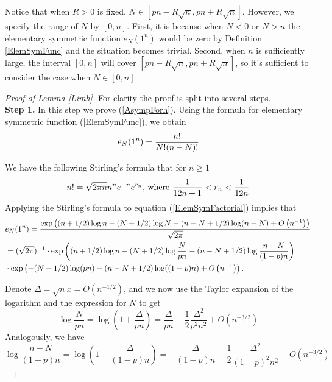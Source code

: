 \begin{remark}
	Notice that when $R>0$ is fixed, $N\in[pn-R\sqrt{n},pn+R\sqrt{n}]$. However, we specify the range of $N$ by $[0,n]$. First, it is because when $N<0$ or $N>n$ the elementary symmetric function $e_{N}(1^{n})$ would be zero by Definition \ref{ElemSymFunc} and the situation becomes trivial. Second, when $n$ is sufficiently large, the interval $[0,n]$ will cover $[pn-R\sqrt{n},pn+R\sqrt{n}]$, so it's sufficient to consider the case when $N\in[0,n]$.
\end{remark}
\begin{proof}[Proof of Lemma \ref{Limh}]
For clarity the proof is split into several steps.\\
\textbf{Step 1.} In this step we prove (\ref	{AsympForh}). Using the formula for elementary symmetric function (\ref{ElemSymFunc}), we obtain
\begin{align}{\label{ElemSymFactorial}}
	e_{N}(1^n)=\frac{n!}{N!(n-N)!}
\end{align}

We have the following Stirling's formula \cite{stirling} that for $n\geq 1$
\begin{equation}{\label{Stirling}}
	n!=\sqrt{2\pi n}n^ne^{-n}e^{r_{n}}\text{, where }\frac{1}{12n+1}<r_{n}<\frac{1}{12n}
\end{equation}
Applying the Stirling's formula to equation (\ref{ElemSymFactorial}) implies that
\begin{equation}{\label{hStirling}}
\begin{split}
	& e_{N}(1^n)=\frac{\exp\left( (n+1/2)\log n-(N+1/2)\log N-(n-N+1/2)\log(n-N)+O\left(n^{-1}\right) \right)}{\sqrt{2\pi}}\\
	& = (\sqrt{2\pi})^{-1}\cdot \exp\left((n+1/2)\log n -(N+1/2)\log \frac{N}{pn}-(n-N+1/2)\log \frac{n-N}{(1-p)n}\right)\\
	&\cdot \exp\left(-(N+1/2)\log(pn)-(n-N+1/2)\log((1-p)n)+O\left(n^{-1}\right)\right).
\end{split}
\end{equation}

Denote $\Delta=\sqrt{n}x=O\left(n^{-1/2}\right)$, and we now use the Taylor expansion of the logarithm and the expression for $N$ to get
\begin{equation*}
	\log \frac{N}{pn}=\log\left(1+\frac{\Delta}{pn}\right) = \frac{\Delta}{pn}-\frac{1}{2}\frac{\Delta^2}{p^2 n^2}+O\left(n^{-3/2}\right)
\end{equation*}
Analogously, we have 
\begin{equation*}
\log \frac{n-N}{(1-p)n} =\log\left(1-\frac{\Delta}{(1-p)n}\right)=-\frac{\Delta}{(1-p)n}-\frac{1}{2}\frac{\Delta^2}{(1-p)^2 n^2}+O\left(n^{-3/2}\right)	
\end{equation*}


\end{proof}
